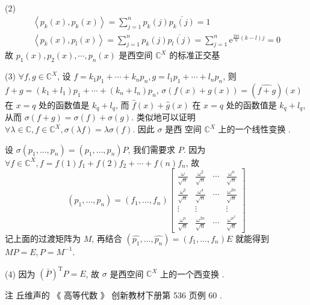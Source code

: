 \documentclass[10pt]{article}
\begin{document}
(2)
$$
\begin{gathered}
\left\langle p_{k}(x), p_{k}(x)\right\rangle=\sum_{j=1}^{n} p_{k}(j) \overline{p_{k}(j)}=1 \\
\left\langle p_{k}(x), p_{l}(x)\right\rangle=\sum_{j=1}^{n} p_{k}(j) \overline{p_{l}(j)}=\sum_{j=1}^{n} \mathrm{e}^{\frac{2 \pi \mathrm{i}}{n}(k-l) j}=0
\end{gathered}
$$
 故  $p_{1}(x), p_{2}(x), \cdots, p_{n}(x)$  是西空间  $\mathbb{C}^{X}$  的标准正交基 

(3) $\forall f, g \in \mathbb{C}^{X}$,  设  $f=k_{1} p_{1}+\cdots+k_{n} p_{n}, g=l_{1} p_{1}+\cdots+l_{n} p_{n}$,  则  $f+g=\left(k_{1}+l_{1}\right) p_{1}+\cdots+\left(k_{n}+l_{n}\right) p_{n}$, $\sigma(f(x)+g(x))=(\widehat{f+g})(x)$  在  $x=q$  处的函数值是  $k_{q}+l_{q}$,  而  $\hat{f}(x)+\hat{g}(x)$  在  $x=q$  处的函数值是  $k_{q}+l_{q}$,  从而  $\sigma(f+g)=\sigma(f)+\sigma(g)$.  类似地可以证明  $\forall \lambda \in \mathbb{C}, f \in \mathbb{C}^{X}, \sigma(\lambda f)=\lambda \sigma(f)$.  因此  $\sigma$  是西   空间  $\mathbb{C}^{X}$  上的一个线性变换 .

 设  $\sigma\left(p_{1}, \ldots, p_{n}\right)=\left(p_{1}, \ldots, p_{n}\right) P$,  我们需要求  $P$.  因为  $\forall f \in \mathbb{C}^{X}, f=f(1) f_{1}+f(2) f_{2}+\cdots+f(n) f_{n}$,  故 
$$
\left(p_{1}, \ldots, p_{n}\right)=\left(f_{1}, \ldots, f_{n}\right)\left[\begin{array}{cccc}
\frac{\omega}{\sqrt{n}} & \frac{\omega^{2}}{\sqrt{n}} & \cdots & \frac{\omega^{n}}{\sqrt{n}} \\
\frac{\omega^{2}}{\sqrt{n}} & \frac{\omega^{4}}{\sqrt{n}} & \cdots & \frac{\omega^{2 n}}{\sqrt{n}} \\
\vdots & \vdots & & \vdots \\
\frac{\omega^{n}}{\sqrt{n}} & \frac{\omega^{2 n}}{\sqrt{n}} & \cdots & \frac{\omega^{n^{2}}}{\sqrt{n}}
\end{array}\right]
$$
 记上面的过渡矩阵为  $M$,  再结合  $\left(\widehat{p_{1}}, \ldots, \widehat{p_{n}}\right)=\left(f_{1}, \ldots, f_{n}\right) E$  就能得到  $M P=E, P=M^{-1}$.

(4)  因为  $(\bar{P})^{\mathrm{T}} P=E$,  故  $\sigma$  是西空间  $\mathbb{C}^{X}$  上的一个西变换 .

 注   丘维声的  《 高等代数 》 创新教材下册第  536  页例  60 .
\end{document}
